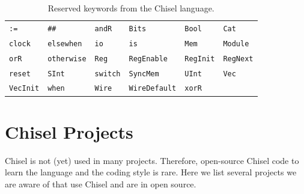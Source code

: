 \documentclass[%
    10pt,
    headinclude, footexclude,
    openright, %
    notitlepage,
    cleardoubleempty,
    headsepline,
    pointlessnumbers,
    bibtotoc, idxtotoc,
    ]{scrbook}
\newcommand{\code}[1]{{\small{\texttt{#1}}}}
\begin{document}
\begin{table}[h]
\centering
\begin{tabular}{llllll}
\code{:=} & \code{\#\#}  & \code{andR}  & \code{Bits}  & \code{Bool}  & \code{Cat} \\
\code{clock} & \code{elsewhen}  & \code{io}  & \code{is}  & \code{Mem}  & \code{Module} \\
\code{orR}  & \code{otherwise}  & \code{Reg}  & \code{RegEnable}  & \code{RegInit}  & \code{RegNext} \\
\code{reset} & \code{SInt}  & \code{switch}  & \code{SyncMem}  & \code{UInt}  & \code{Vec} \\
\code{VecInit} & \code{when}  & \code{Wire}  & \code{WireDefault}  & \code{xorR}  \\
\end{tabular}
\caption{Reserved keywords from the Chisel language.}
\label{tab:reserved:chisel}
\end{table}

\chapter{Chisel Projects}


Chisel is not (yet) used in many projects. Therefore, open-source Chisel code
to learn the language and the coding style is rare. Here we list several projects
we are aware of that use Chisel and are in open source.
\end{document}
